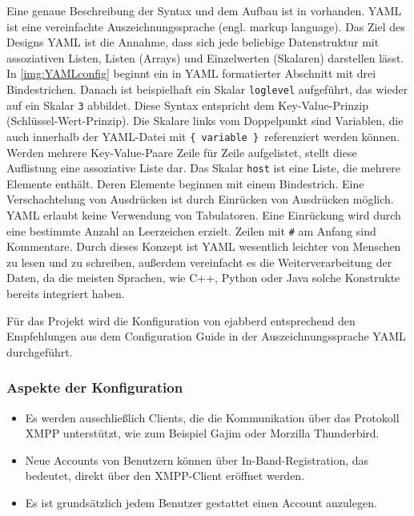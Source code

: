 \documentclass[a4paper,titlepage,halfparskip,12pt]{scrreprt}
\begin{document}
\begin{onehalfspacing}
Eine genaue Beschreibung der Syntax und dem Aufbau ist in \cite{specificationYAML} vorhanden. \ac{YAML} ist eine vereinfachte Auszeichnungssprache (engl. markup language). Das Ziel des Designs \ac{YAML} ist die Annahme, dass sich jede beliebige Datenstruktur mit assoziativen Listen, Listen (Arrays) und Einzelwerten (Skalaren) darstellen lässt. In \autoref{img:YAMLconfig} beginnt ein in \ac{YAML} formatierter Abschnitt mit drei Bindestrichen. Danach ist beispielhaft ein Skalar \texttt{loglevel} aufgeführt, das wieder auf ein Skalar \texttt{3} abbildet. Diese Syntax entspricht dem Key-Value-Prinzip (Schlüssel-Wert-Prinzip). Die Skalare links vom Doppelpunkt sind Variablen, die auch innerhalb der \ac{YAML}-Datei mit \glqq \texttt{\{ variable \}}\grqq\ referenziert werden können. Werden mehrere Key-Value-Paare Zeile für Zeile aufgelistet, stellt diese Auflistung eine assoziative Liste dar. Das Skalar \texttt{host} ist eine Liste, die mehrere Elemente enthält. Deren Elemente beginnen mit einem Bindestrich. Eine Verschachtelung von Ausdrücken ist durch Einrücken von Ausdrücken möglich. \ac{YAML} erlaubt keine Verwendung von Tabulatoren. Eine Einrückung wird durch eine bestimmte Anzahl an Leerzeichen erzielt. Zeilen mit \texttt{\#} am Anfang sind Kommentare. Durch dieses Konzept ist \ac{YAML} wesentlich leichter von Menschen zu lesen und zu schreiben, außerdem vereinfacht es die Weiterverarbeitung der Daten, da die meisten Sprachen, wie C++, Python oder Java solche Konstrukte bereits integriert haben.

Für das Projekt wird die Konfiguration von ejabberd entsprechend den Empfehlungen aus dem Configuration Guide \cite{ejabberdDoc} in der Auszeichnungssprache \ac{YAML} durchgeführt.

\subsubsection*{Aspekte der Konfiguration}

\begin{itemize}
\item Es werden ausschließlich Clients, die die Kommunikation über das Protokoll \ac{XMPP} unterstützt, wie zum Beispiel Gajim oder Morzilla Thunderbird.

\item Neue Accounts von Benutzern können über In-Band-Registration, das bedeutet, direkt über den \ac{XMPP}-Client eröffnet werden.

\item Es ist grundsätzlich jedem Benutzer gestattet einen Account anzulegen.


\end{itemize}
\end{onehalfspacing}
\end{document}
